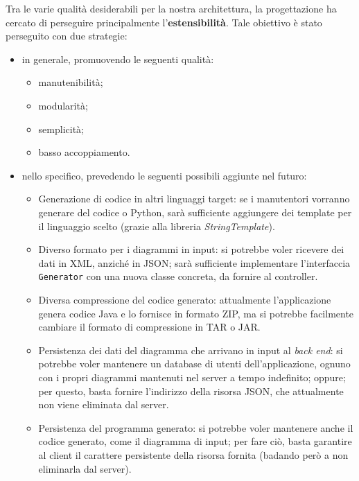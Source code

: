Tra le varie qualità desiderabili per la nostra architettura, la progettazione ha cercato di perseguire principalmente l'\textbf{estensibilità}. Tale obiettivo è stato perseguito con due strategie:
\begin{itemize}
	\item in generale, promuovendo le seguenti qualità:
	\begin{itemize}
		\item manutenibilità;
		\item modularità;
		\item semplicità;
		\item basso accoppiamento.
	\end{itemize}
	\item nello specifico, prevedendo le seguenti possibili aggiunte nel futuro:
	\begin{itemize}
		\item Generazione di codice in altri linguaggi target: se i manutentori vorranno generare del codice  o Python, sarà sufficiente aggiungere dei template per il linguaggio scelto (grazie alla libreria \emph{StringTemplate}).
		\item Diverso formato per i diagrammi in input: si potrebbe voler ricevere dei dati in XML, anziché in JSON; sarà sufficiente implementare l'interfaccia \texttt{Generator} con una nuova classe concreta, da fornire al controller.
		\item Diversa compressione del codice generato: attualmente l'applicazione genera codice Java e lo fornisce in formato ZIP, ma si potrebbe facilmente cambiare il formato di compressione in TAR o JAR.
		\item Persistenza dei dati del diagramma che arrivano in input al \emph{back end}: si potrebbe voler mantenere un database di utenti dell'applicazione, ognuno con i propri diagrammi mantenuti nel server a tempo indefinito; oppure; per questo, basta fornire l'indirizzo della risorsa JSON, che attualmente non viene eliminata dal server. %
		\item Persistenza del programma generato: si potrebbe voler mantenere anche il codice generato, come il diagramma di input; per fare ciò, basta garantire al client il carattere persistente della risorsa fornita (badando però a non eliminarla dal server). %
	\end{itemize}
\end{itemize}



